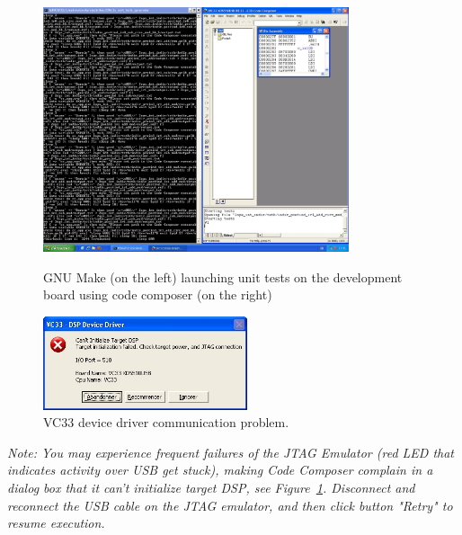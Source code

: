 \begin{figure}[!h]
	\begin{center}
		\begin{minipage}{\textwidth}
			\begin{minipage}{9.5cm}
				\begin{center}
					\includegraphics[width=9.0cm]{tms320c3x/fig_code_composer.jpg}
					\caption{\label{fig:tms320c3x_cc} GNU Make (on the left) launching unit tests on the development board using code composer (on the right)}
				\end{center}
			\end{minipage}
			\begin{minipage}{6.5cm}
				\begin{center}
		\includegraphics[width=6.0cm]{tms320c3x/fig_driver_error.jpg}
		\caption{\label{fig:tms320c3x_driver_error} VC33 device driver communication problem.}
				\end{center}
			\end{minipage}
		\end{minipage}
	\end{center}
\end{figure}

\textit{Note: You may experience frequent failures of the JTAG Emulator (red LED that indicates activity over USB get stuck), making Code Composer complain in a dialog box that it can't initialize target DSP, see Figure~\ref{fig:tms320c3x_driver_error}. Disconnect and reconnect the USB cable on the JTAG emulator, and then click button "Retry" to resume execution.}

